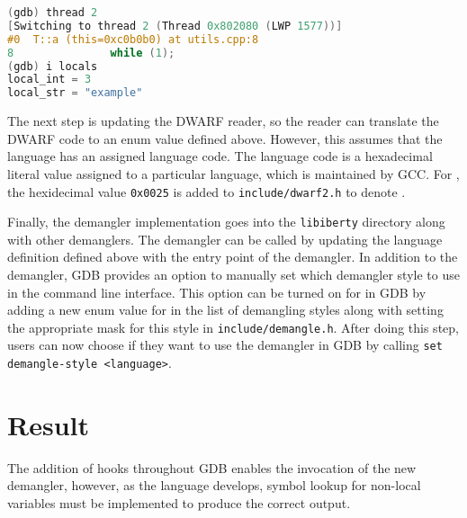 \begin{lstlisting}[language=C++, caption={}, label={}]
(gdb) thread 2
[Switching to thread 2 (Thread 0x802080 (LWP 1577))]
#0  T::a (this=0xc0b0b0) at utils.cpp:8
8               while (1);
(gdb) i locals
local_int = 3
local_str = "example"
\end{lstlisting}

The next step is updating the DWARF reader, so the reader can translate the DWARF code to an enum value defined
above. However, this assumes that the language has an assigned language code.
The language code is a hexadecimal literal value assigned to a particular
language, which is maintained by GCC. For \CFA, the hexidecimal value
\verb|0x0025| is added to \verb|include/dwarf2.h| to denote \CFA.

Finally, the demangler implementation goes into the \verb|libiberty| directory along with
other demanglers. The demangler can be called by updating the language
definition defined above with the entry point of the \CFAS demangler.
In addition to the demangler, GDB provides an option
to manually set which demangler style to use in the command line interface.
This option can be turned on for \CFAS in GDB by adding a new enum value for \CFAS in
the list of demangling styles along with setting the appropriate mask for this
style in \verb|include/demangle.h|. After doing this step, users can now choose
if they want to use the \CFAS demangler in GDB by calling \verb|set demangle-style <language>|.

\section{Result}
The addition of hooks throughout GDB enables the invocation of the new \CFAS demangler, however, as the
language develops, symbol lookup for non-local variables must be implemented to
produce the correct output.
